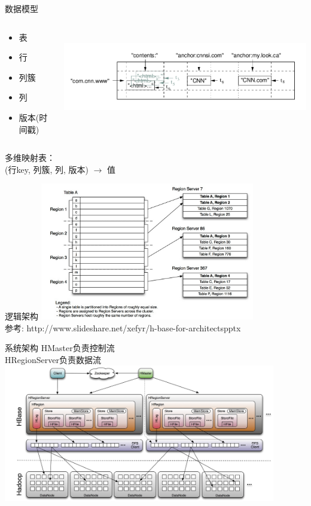 \documentclass[xcolor=table]{beamer}
\begin{document}
\begin{CJK}{UTF8}{gkai}
\begin{frame}{数据模型}
\begin{columns}
	\begin{column}{0.4\textwidth}
		\begin{itemize}
			\item 表
			\item 行
			\item 列簇
			\item 列
			\item 版本(时间戳)
		\end{itemize}
	\end{column}
	\begin{column}{0.6\textwidth}
		\includegraphics[width=\textwidth, height=4cm]{hbase-data-model.png}
	\end{column}
\end{columns}
	\bigskip
	多维映射表：\\ 
	(行key, 列簇, 列, 版本) $\rightarrow$ 值
\end{frame}

\begin{frame}{逻辑架构}
\includegraphics[width=\textwidth, height=6cm]{logical-arch.png} \\
参考: http://www.slideshare.net/xefyr/h-base-for-architectspptx
\end{frame}

\begin{frame}{系统架构}
HMaster负责控制流\\
HRegionServer负责数据流\\
\includegraphics[width=\textwidth, height=6cm]{hbase-arch.png}
\end{frame}


\end{CJK}
\end{document}
